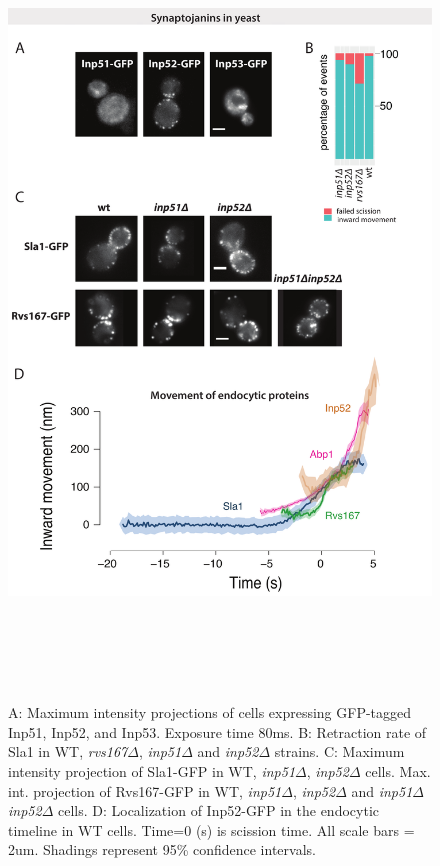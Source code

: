 		
\begin{figure}[H]
	\centering
	\includegraphics[width=21cm,height=21cm,keepaspectratio]{figures/results_final/inp}
	\caption[Synaptojanin-like proteins in yeast]
	{A: Maximum intensity projections of cells expressing GFP-tagged Inp51, Inp52, and Inp53. Exposure time 80ms.
		B: Retraction rate of Sla1 in WT, \textit{rvs167$\Delta$}, \textit{inp51$\Delta$} and \textit{inp52$\Delta$} strains.
		C: Maximum intensity projection of Sla1-GFP in WT,  \textit{inp51$\Delta$},  \textit{inp52$\Delta$} cells. Max. int. projection of Rvs167-GFP in WT,  \textit{inp51$\Delta$},  \textit{inp52$\Delta$} and  \textit{inp51$\Delta$}\textit{inp52$\Delta$}   cells.
		D: Localization of Inp52-GFP in the endocytic timeline in WT cells. Time=0 (s) is scission time.
		All scale bars = 2um. Shadings represent 95\% confidence intervals.
		\label{fig_inp}}
\end{figure}


